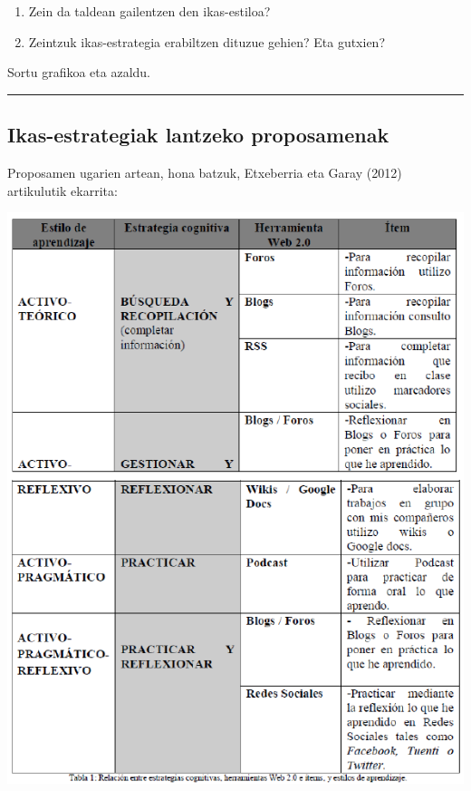 \documentclass[]{book}
\providecommand{\tightlist}{%
  \setlength{\itemsep}{0pt}\setlength{\parskip}{0pt}}
\begin{document}
\begin{enumerate}
\def\labelenumi{\arabic{enumi}.}
\tightlist
\item
  Zein da taldean gailentzen den ikas-estiloa?
\item
  Zeintzuk ikas-estrategia erabiltzen dituzue gehien?
  Eta gutxien?
\end{enumerate}

Sortu grafikoa eta azaldu.

\begin{center}\rule{0.5\linewidth}{\linethickness}\end{center}

\hypertarget{ikas-estrategiak-lantzeko-proposamenak}{%
\subsection{Ikas-estrategiak lantzeko proposamenak}\label{ikas-estrategiak-lantzeko-proposamenak}}

Proposamen ugarien artean, hona batzuk, Etxeberria eta Garay (2012) artikulutik ekarrita:

\includegraphics{assets/06-03.png}
\end{document}
